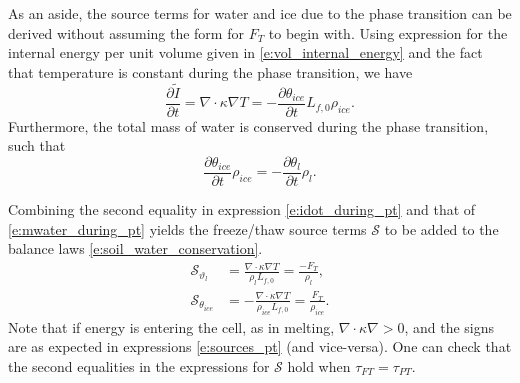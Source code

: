 \documentclass[twoside,10pt]{report}
\begin{document}
As an aside, the source terms for water and ice due to the phase transition can be derived without assuming the form for $F_T$ to begin with. Using expression for the internal energy per unit volume given in \eqref{e:vol_internal_energy} and the fact that temperature is constant during the phase transition, we have
\begin{equation}\label{e:idot_during_pt}
    \frac{\partial \tilde{I}}{\partial t} = \nabla \cdot \kappa \nabla T = -\frac{\partial \theta_{ice}}{\partial t} L_{f,0} \rho_{ice}.
\end{equation}
Furthermore, the total mass of water is conserved during the phase transition, such that
\begin{equation}\label{e:mwater_during_pt}
    \frac{\partial\theta_{ice}}{\partial t} \rho_{ice}= -\frac{\partial\theta_{l}}{\partial t} \rho_{l}.
\end{equation}

Combining the second equality in expression \eqref{e:idot_during_pt} and that of \eqref{e:mwater_during_pt} yields the freeze/thaw source terms $\mathcal{S}$ to be added to the balance laws \eqref{e:soil_water_conservation}. 
\begin{align}\label{e:sources_pt}
\mathcal{S}_{\vartheta_l} &= \frac{\nabla \cdot \kappa \nabla T}{\rho_l L_{f,0}} = \frac{-F_T}{\rho_l}, \nonumber \\
\mathcal{S}_{\theta_{ice}} &= -\frac{\nabla \cdot \kappa \nabla T}{\rho_{ice} L_{f,0}} = \frac{F_T}{\rho_{ice}}.
\end{align}
Note that if energy is entering the cell, as in melting, $\nabla \cdot \kappa \nabla>0$, and the signs are as expected in expressions \eqref{e:sources_pt} (and vice-versa). One can check that the second equalities in the expressions for $\mathcal{S}$ hold when $\tau_{FT} = \tau_{PT}$.


\end{document}
